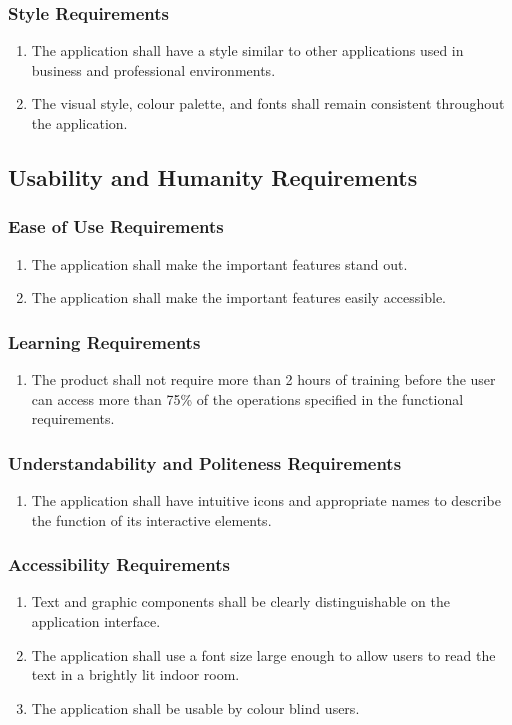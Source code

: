 \documentclass{article}
\begin{document}
\subsubsection{Style Requirements}
\begin{enumerate}[STR1]
    \item The application shall have a style similar to other applications used in business and professional environments.
    \item The visual style, colour palette, and fonts shall remain consistent throughout the application.
\end{enumerate}

\subsection{Usability and Humanity Requirements}
\subsubsection{Ease of Use Requirements}
\begin{enumerate}[EUR1]
    \item The application shall make the important features stand out.
    \item The application shall make the important features easily accessible.
\end{enumerate}

\subsubsection{Learning Requirements}
\begin{enumerate}[LER1]
    \item The product shall not require more than 2 hours of training before the user can access more than 75\% of the operations specified in the functional requirements.
\end{enumerate}

\subsubsection{Understandability and Politeness Requirements}
\begin{enumerate}[UPR1]
    \item The application shall have intuitive icons and appropriate names to describe the function of its interactive elements.
\end{enumerate}

\subsubsection{Accessibility Requirements}
\begin{enumerate}[{A}CR1]
    \item Text and graphic components shall be clearly distinguishable on the application interface.
    \item The application shall use a font size large enough to allow users to read the text in a brightly lit indoor room.
    \item The application shall be usable by colour blind users.
\end{enumerate}
\end{document}
